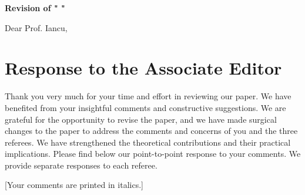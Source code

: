 \documentclass[opre, nonblindrev]{informswp}
\newcommand{\1}[1]{\mathds{1}{\left(#1\right)}}
\begin{document}



\centerline{\large\textbf{Revision of " "}}

\noindent Dear Prof. Iancu,

\newpage

\section*{Response to the Associate Editor}

Thank you very much for your time and effort in reviewing our paper. We have benefited from your insightful comments and constructive suggestions. We are grateful for the opportunity to revise the paper, and we have made surgical changes to the paper to address the comments and concerns of you and the three referees. We have strengthened the theoretical contributions and their practical implications. Please find below our point-to-point response to your comments. We provide separate responses to each referee.

[Your comments are printed in italics.]

\medskip
\end{document}
